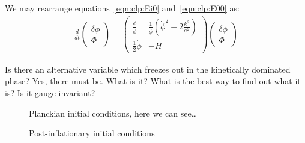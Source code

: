 We may rearrange equations~\eqref{eqn:clp:Ei0} and~\eqref{eqn:clp:E00} as:
\begin{align}
  \frac{d}{dt}
  \left(
  \begin{array}{c}
    \delta \phi \\
    \Phi
  \end{array}
  \right)
  =
  \left(%
  \begin{array}{cc}
    \frac{\ddot{\phi}}{\dot{\phi}} & \frac{1}{\dot{\phi}}\left( \dot{\phi}^2 - 2\frac{k^2}{a^2} \right) \\
    \frac{1}{2}\dot{\phi} & -H 
  \end{array}
  \right)
  \left(%
  \begin{array}{c}
    \delta \phi \\
    \Phi
  \end{array}
  \right)
\end{align}


Is there an alternative variable which freezes out in the kinetically dominated phase? Yes, there must be. What is it? What is the best way to find out what it is? Is it gauge invariant?

\ifdefined\lightweight{}
\else
\begin{figure}
  
  
  \caption{Planckian initial conditions, here we can see\ldots}
\end{figure}

\begin{figure}
  
  
  \caption{Post-inflationary initial conditions}
\end{figure}
\fi
